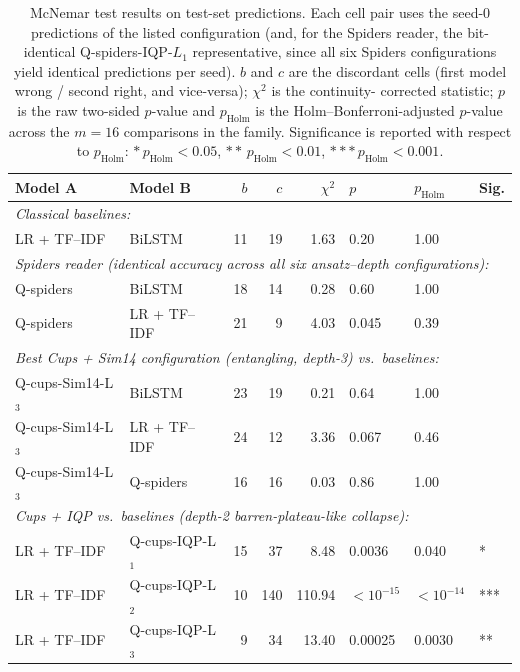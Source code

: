 \documentclass[runningheads]{llncs}
\begin{document}
\begin{table}[t]
\centering
\caption{McNemar test results on test-set predictions. Each cell pair
uses the seed-0 predictions of the listed configuration (and, for the
Spiders reader, the bit-identical Q-spiders-IQP-\(L_1\) representative,
since all six Spiders configurations yield identical predictions
per seed). \(b\) and \(c\) are the discordant cells (first model
wrong / second right, and vice-versa); \(\chi^2\) is the continuity-
corrected statistic; \(p\) is the raw two-sided \(p\)-value and
\(p_{\text{Holm}}\) is the Holm--Bonferroni-adjusted \(p\)-value
across the \(m=16\) comparisons in the family. Significance is
reported with respect to \(p_{\text{Holm}}\): \(*\,p_{\text{Holm}}<0.05\),
\(**\,p_{\text{Holm}}<0.01\), \(***\,p_{\text{Holm}}<0.001\).}
\label{tab:mcnemar}
\begin{tabular}{llrrrlll}
\toprule
Model A & Model B & \(b\) & \(c\) & \(\chi^2\) & \(p\) & \(p_{\text{Holm}}\) & Sig. \\
\midrule
\multicolumn{8}{l}{\emph{Classical baselines:}} \\
LR + TF--IDF & BiLSTM            & 11 & 19  & 1.63   & 0.20      & 1.00     &     \\
\multicolumn{8}{l}{\emph{Spiders reader (identical accuracy across all six ansatz--depth configurations):}} \\
Q-spiders    & BiLSTM            & 18 & 14  & 0.28   & 0.60      & 1.00     &     \\
Q-spiders    & LR + TF--IDF      & 21 & 9   & 4.03   & 0.045     & 0.39     &     \\
\multicolumn{8}{l}{\emph{Best Cups + Sim14 configuration (entangling, depth-3) vs.\ baselines:}} \\
Q-cups-Sim14-L\(_3\) & BiLSTM    & 23 & 19  & 0.21   & 0.64      & 1.00     &     \\
Q-cups-Sim14-L\(_3\) & LR + TF--IDF & 24 & 12 & 3.36   & 0.067     & 0.46     &     \\
Q-cups-Sim14-L\(_3\) & Q-spiders & 16 & 16  & 0.03   & 0.86      & 1.00     &     \\
\multicolumn{8}{l}{\emph{Cups + IQP vs.\ baselines (depth-2 barren-plateau-like collapse):}} \\
LR + TF--IDF & Q-cups-IQP-L\(_1\) & 15 & 37  & 8.48   & 0.0036    & 0.040    & *   \\
LR + TF--IDF & Q-cups-IQP-L\(_2\) & 10 & 140 & 110.94 & \(< 10^{-15}\) & \(<10^{-14}\) & *** \\
LR + TF--IDF & Q-cups-IQP-L\(_3\) & 9  & 34  & 13.40  & 0.00025   & 0.0030   & **  \\

\end{tabular}
\end{table}
\end{document}
